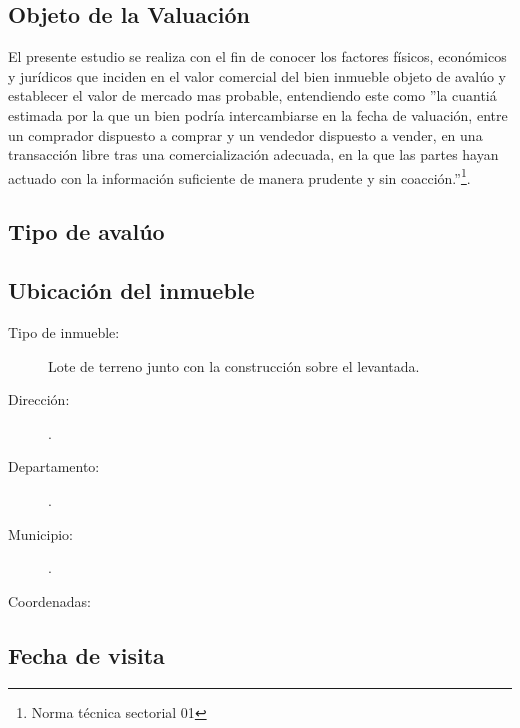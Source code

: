 \documentclass[12pt,a4paper,twoside]{article}
\begin{document}
{\begin{tabular}{ l p{7.5cm} }
\end{tabular}


\subsection{Objeto de la Valuación}

El presente estudio se realiza con el fin de conocer los factores físicos, económicos y jurídicos que inciden en el valor comercial del bien inmueble objeto de avalúo y establecer el valor de mercado mas probable, entendiendo este como ''la cuantiá estimada por la que un bien podría intercambiarse en la fecha de valuación, entre un comprador dispuesto a comprar y un vendedor dispuesto a vender, en una transacción libre tras una comercialización adecuada, en la que las partes hayan actuado con la información suficiente de manera prudente y sin coacción.''\footnote{Norma técnica sectorial 01}.

\subsection{Tipo de avalúo}


\subsection{Ubicación del inmueble}

\begin{description}
	
	\item[Tipo de inmueble: ] Lote de terreno junto con la construcción sobre el levantada.
	\item[Dirección: ] \Direccion.
	\item[Departamento: ] \Departamento.
	\item[Municipio: ] \Municipio.
	\item[Coordenadas: ] %
	
\end{description}
 
\subsection{Fecha de visita}
 
}
\end{document}
